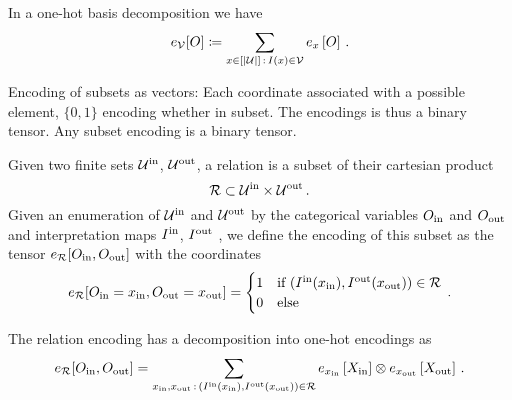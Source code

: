 


In a one-hot basis decomposition we have
	\[ e_{\mathcal{V}}[O] \coloneqq \sum_{x\in[\left|\mathcal{U}\right|] \, : \, I(x)\in\mathcal{V}}e_{x}\left[O\right] \, . \]

Encoding of subsets as vectors: Each coordinate associated with a possible element, $\{0,1\}$ encoding whether in subset.
The encodings is thus a binary tensor.
Any subset encoding is a binary tensor.

\begin{definition}
	Given two finite sets $\mathcal{U}^{\mathrm{in}}$, $\mathcal{U}^{\mathrm{out}}$, a relation is a subset of their cartesian product
		\[ \mathcal{R} \subset \mathcal{U}^{\mathrm{in}} \times \mathcal{U}^{\mathrm{out}} \, . \]
	Given an enumeration of $\mathcal{U}^{\mathrm{in}}$ and $\mathcal{U}^{\mathrm{out}}$ by the categorical variables $O_{\mathrm{in}}$ and $O_{\mathrm{out}}$ and interpretation maps 
	$I^{\mathrm{in}}$, $I^{\mathrm{out}}$
	, we define the encoding of this subset as the tensor $e_{\mathcal{R}}[O_{\mathrm{in}},O_{\mathrm{out}}]$ with the coordinates
	\begin{align}
		e_{\mathcal{R}}[O_{\mathrm{in}}=x_{\mathrm{in}},O_{\mathrm{out}}=x_{\mathrm{out}}]
		= \begin{cases}
		1 & \text{if } (I^{\mathrm{in}}(x_{\mathrm{in}}),I^{\mathrm{out}}(x_{\mathrm{out}})) \in \mathcal{R} \\
		0 & \text{else}
		\end{cases} \, . 
	\end{align}
\end{definition}

The relation encoding has a decomposition into one-hot encodings as
	\[ e_{\mathcal{R}}[O_{\mathrm{in}},O_{\mathrm{out}}]
	 = \sum_{x_{\mathrm{in}},x_{\mathrm{out}} \, : \, (I^{\mathrm{in}}(x_{\mathrm{in}}),I^{\mathrm{out}}(x_{\mathrm{out}})) \in \mathcal{R}}
	e_{x_{\mathrm{in}}}\left[X_{\mathrm{in}}\right]  \otimes e_{x_{\mathrm{out}}}\left[X_{\mathrm{out}}\right]  \, . \]

